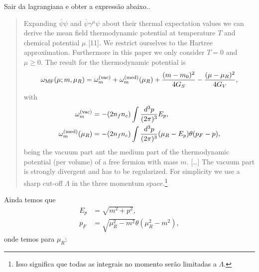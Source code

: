 Sair da lagrangiana e obter a expressão abaixo.\cite{Asakawa1989}.

\begin{quote}
Expanding $\bar{\psi}\psi$ and $\bar{\psi}\gamma^\mu\psi$ about their thermal expectation values we can derive the mean field thermodynamic potential at temperature $T$ and chemical potential $\mu$ [11]. We restrict ourselves to the Hartree approximation. Furthermore in this paper we only consider $T=0$ and $\mu \geqslant 0$. The result for the thermodynamic potential is
\begin{equation}\label{Eq:Def_pot_termo}
	\omega_{\rm{MF}}(\mu; m, \mu_R) = \omega_m^{\rm{(vac)}} + \omega_m^{\rm{(med)}}(\mu_R) + \frac{(m - m_0)^2}{4G_S} - \frac{(\mu - \mu_R)^2}{4G_V},
\end{equation}
%
with
\begin{align}
	\omega_m^{\rm{(vac)}} &= - (2n_fn_c) \int \frac{d^3p}{(2\pi)^3} E_p, \label{Eq:Def_omega_vac}\\
	\omega_m^{\rm{(med)}}(\mu_R) &= - (2n_fn_c) \int \frac{d^3p}{(2\pi)^3}(\mu_R - E_p)\theta(p_F - p), \label{Eq:Def_omega_med}
\end{align}
%
being the vacuum part ant the medium part of the thermodynamic potential (per volume) of a free fermion with mass $m$. [\dots] The vacuum part is strongly divergent and has to be regularized. For simplicity we use a sharp cut-off $\Lambda$ in the three momentum space.\footnote{Isso significa que todas as integrais no momento serão limitadas a $\Lambda$.}
\end{quote}
%
Ainda temos que
\begin{align}
	E_p &= \sqrt{m^2+p^2}, \label{Eq:Def_E}\\
	p_F &= \sqrt{\mu_R^2 - m^2}\theta(\mu_R^2 - m^2), \label{Eq:Rel_pot_quim_renorm_mom_fermi}
\end{align}
%
onde temos para $\mu_R$:
